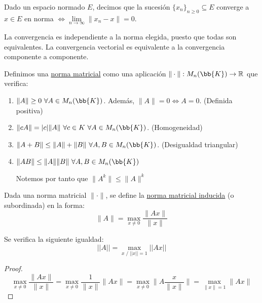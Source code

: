 \begin{definicion}
    Dado un espacio normado $E$, decimos que la sucesión $\{x_n\}_{n \geq 0} \subseteq E$ converge a $x \in E$ en norma
    $\Longleftrightarrow \lim\limits_{n \to \infty}\|x_n-x\|=0$.
\end{definicion}

\noindent
La convergencia es independiente a la norma elegida, puesto que todas son equivalentes. La convergencia vectorial es
equivalente a la convergencia componente a componente.

\begin{definicion}
    Definimos una \underline{norma matricial} como una aplicación $\|\cdot\|:M_n(\bb{K}) \rightarrow \R$ que verifica:
    \begin{enumerate}
        \item $\|A\|\geq 0 \ \forall A \in M_n(\bb{K})$. Además, $\|A\|=0 \Leftrightarrow A=0$. (Definida positiva)
        \item $\|cA\|=|c|\|A\| \ \forall c \in K~\forall A \in M_n(\bb{K})$. (Homogeneidad)
        \item $\|A+B\|\leq \|A\|+\|B\| \ \forall A,B \in M_n(\bb{K})$. (Desigualdad triangular)
        \item $\|AB\|\leq \|A\|\|B\| \ \forall A,B \in M_n(\bb{K})$

        Notemos por tanto que $\|A^k\|\leq \|A\|^k$
    \end{enumerate}
\end{definicion}

\begin{definicion}
    Dada una norma matricial $\|\cdot\|$, se define la \underline{norma matricial inducida} (o subordinada) en la forma:
    $$\|A\| = \max_{x \neq 0} \dfrac{\|Ax\|}{\|x\|}$$
\end{definicion}
\begin{prop} Se verifica la siguiente igualdad:
\begin{equation*}
    ||A||= \max_{x \;/\; ||x||=1} ||Ax||
\end{equation*}
\end{prop}
\begin{proof}
    $$\max_{x \neq 0} \dfrac{\|Ax\|}{\|x\|} = \max_{x \neq 0} \dfrac{1}{\|x\|} \|Ax\| = \max_{x \neq 0} \|A \dfrac{x}{\|x\|}\|=
        \max_{\|x\|=1}\|Ax\|$$
\end{proof}


